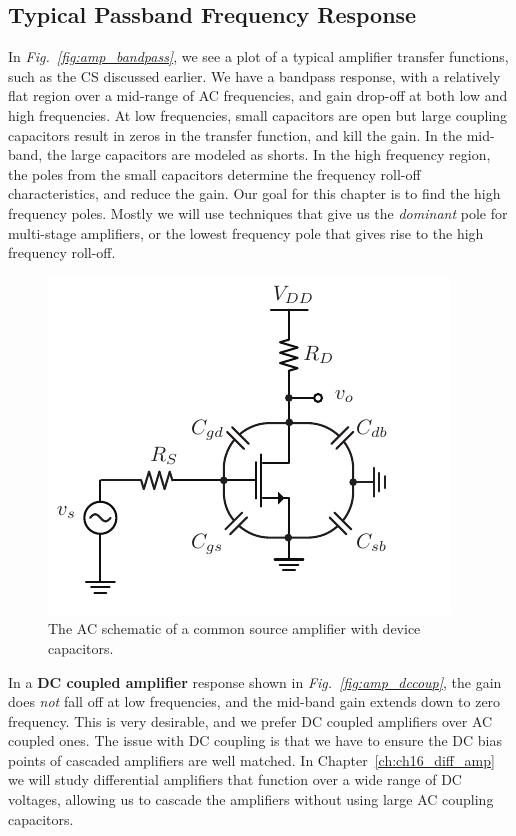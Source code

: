 \subsection{Typical Passband Frequency Response}
In \emph{Fig.~\ref{fig:amp_bandpass}}, we see a plot of a typical amplifier transfer functions, such as the CS discussed earlier.  We have a bandpass response, with a relatively flat region over a mid-range of AC frequencies, and gain drop-off at both low and high frequencies.  At low frequencies, small capacitors are open but large coupling capacitors result in zeros in the transfer function, and kill the gain.  In the mid-band, the large capacitors are modeled as shorts.  In the high frequency region, the poles from the small capacitors determine the frequency roll-off characteristics, and reduce the gain. Our goal for this chapter is to find the high frequency poles.  Mostly we will use techniques that give us the \emph{dominant} pole for multi-stage amplifiers, or the lowest frequency pole that gives rise to the high frequency roll-off.

\begin{figure}[t]
\centering
\includegraphics[scale=1.35]{cs_amp_caps}
\caption{The AC schematic of a common source amplifier with device capacitors.} \label{fig:cs_amp_caps}
\end{figure}
In a \textbf{DC coupled amplifier} response shown in \emph{Fig.~\ref{fig:amp_dccoup}}, the gain does \textit{not} fall off at low frequencies, and the mid-band gain extends down to zero frequency. This is very desirable, and we prefer DC coupled amplifiers over AC coupled ones.  The issue with DC coupling is that we have to ensure the DC bias points of cascaded amplifiers are well matched.  In Chapter~\ref{ch:ch16_diff_amp} we will study differential amplifiers that function over a wide range of DC voltages, allowing us to cascade the amplifiers without using large AC coupling capacitors.
